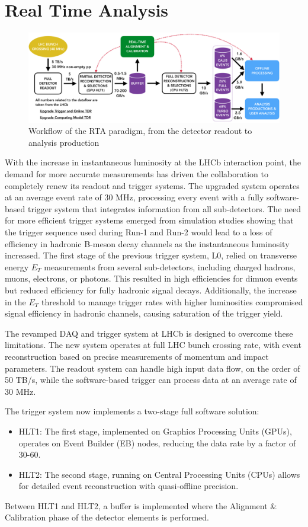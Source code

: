 \section{Real Time Analysis}
\begin{figure}
    \centering
    \includegraphics[width=\textwidth]{figures/hidef_RTA_dataflow_widescreen.png}
    \caption{Workflow of the RTA paradigm, from the detector readout to analysis production}
    \label{fig:RTA}
\end{figure}
With the increase in instantaneous luminosity at the LHCb interaction point, the demand for more accurate measurements has driven the collaboration to completely renew its readout and trigger systems. The upgraded system operates at an average event rate of 30 MHz, processing every event with a fully software-based trigger system that integrates information from all sub-detectors. The need for more efficient trigger systems emerged from simulation studies showing that the trigger sequence used during Run-1 and Run-2 would lead to a loss of efficiency in hadronic B-meson decay channels as the instantaneous luminosity increased. The first stage of the previous trigger system, L0, relied on transverse energy $E_T$ measurements from several sub-detectors, including charged hadrons, muons, electrons, or photons. This resulted in high efficiencies for dimuon events but reduced efficiency for fully hadronic signal decays. Additionally, the increase in the $E_T$ threshold to manage trigger rates with higher luminosities compromised signal efficiency in hadronic channels, causing saturation of the trigger yield.

The revamped DAQ and trigger system at LHCb is designed to overcome these limitations. The new system operates at full LHC bunch crossing rate, with event reconstruction based on precise measurements of momentum and impact parameters. The readout system can handle high input data flow, on the order of 50 TB/s, while the software-based trigger can process data at an average rate of 30 MHz.

The trigger system now implements a two-stage full software solution:
\begin{itemize}
\item HLT1: The first stage, implemented on Graphics Processing Units (GPUs), operates on Event Builder (EB) nodes, reducing the data rate by a factor of 30-60.
\item HLT2: The second stage, running on Central Processing Units (CPUs) allows for detailed event reconstruction with quasi-offline precision.
\end{itemize}
Between HLT1 and HLT2, a buffer is implemented where the Alignment \& Calibration phase of the detector elements is performed.

